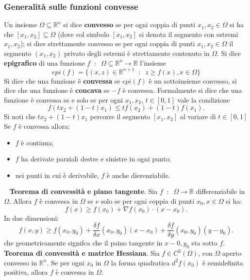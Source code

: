 \subsubsection{Generalità sulle funzioni convesse}
Un insieme $\Omega \subseteq \mathbb{R}^n$ si dice \textbf{convesso} se per ogni coppia di punti $x_1, x_2 \in \Omega$ si ha che $[x_1,x_2]\subseteq \Omega$ (dove col simbolo $[x_1,x_2]$ si denota il segmento con estremi $x_1,x_2$); si dice strettamente convesso se per ogni coppia di punti $x_1,x_2 \in \Omega$ il segmento $(x_1,x_2)$ privato degli estremi è strettamente contenuto in $\Omega$.\newline
\newline
Si dice \textbf{epigrafico} di una funzione $f \;\;:\;\; \Omega \subseteq \mathbb{R}^n \rightarrow  \mathbb{R}$ l'insieme
\[
    epi(f)=\{(x,z) \in \mathbb{R}^{n+1} \;\;:\;\; z\geq f(x), x \in\Omega\}
\]
\newline
\newline
Si dice che una funzione è \textbf{convessa} se $epi(f)$ è un sottoinsieme convesso, si dice che una funzione è \textbf{concava} se $-f$ è convessa.\newline
Formalmente si dice che una funzione è convessa se e solo se per ogni $x_1,x_2$, $t \in [0,1]$ vale la condizione
\[
    f(tx_2 + (1-t)x_1) \leq tf(x_2) + (1-t)f(x_1).
\]
Si noti che $tx_2 + (1-t)x_1$ percorre il segmento $[x_1,x_2]$ al variare di $t \in[0,1]$\newline
\newline
Se $f$ è convessa allora:
\begin{itemize}
    \item $f$ è continua;
    \item $f$ ha derivate parziali destre e sinistre in ogni punto;
    \item nei punti in cui è derivabile, $f$ è anche dierenziabile.
\end{itemize}
\ \newline
\textbf{Teorema di convessità e piano tangente}. Sia $f \;\;:\;\; \Omega \rightarrow \mathbb{R}$ differenziabile in $\Omega$. Allora $f$ è convessa in $\Omega$ se e solo se per ogni coppia di punti $x_0, x \in \Omega$ si ha:
\[
    f(x) \geq f(x_0) + \nabla f(x_0) \cdot (x-x_0).
\]
In due dimensioni:
\[
    f(x,y) \geq f(x_0,y_0) + \frac{\delta f}{\delta x}(x_0,y_0)(x-x_0)+\frac{\delta f}{\delta y}(x_0, y_0)(y-y_0).
\]
che geometricamente signifca che il paino tangente in $x-0, y_0$ sta sotto $f$.\newline
\newline
\textbf{Teorema di convessità e matrice Hessiana}. Sia $f \in C^2(\Omega)$, con $\Omega$ aperto convesso in $\mathbb{R}^n$. Se per ogni $x_0$ in $\Omega$ la forma quadratica $d^2f(x_0)$ è semidefinita positiva, allora $f$ è convessa in $\Omega$.

